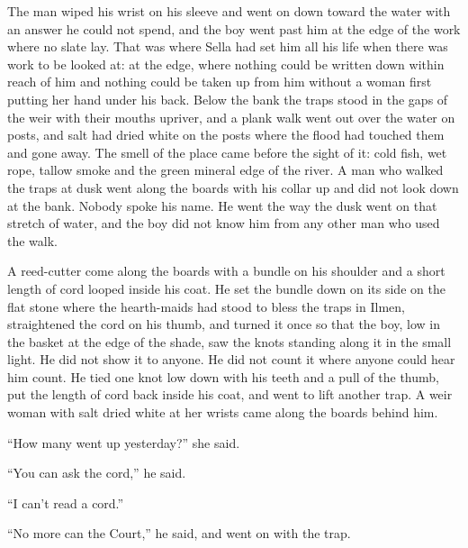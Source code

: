 The man wiped his wrist on his sleeve and went on down toward the water with an answer he could not spend, and the boy went past him at the edge of the work where no slate lay. That was where Sella had set him all his life when there was work to be looked at: at the edge, where nothing could be written down within reach of him and nothing could be taken up from him without a woman first putting her hand under his back. Below the bank the traps stood in the gaps of the weir with their mouths upriver, and a plank walk went out over the water on posts, and salt had dried white on the posts where the flood had touched them and gone away. The smell of the place came before the sight of it: cold fish, wet rope, tallow smoke and the green mineral edge of the river. A man who walked the traps at dusk went along the boards with his collar up and did not look down at the bank. Nobody spoke his name. He went the way the dusk went on that stretch of water, and the boy did not know him from any other man who used the walk.

\scenebreak

A reed-cutter come along the boards with a bundle on his shoulder and a short length of cord looped inside his coat. He set the bundle down on its side on the flat stone where the hearth-maids had stood to bless the traps in Ilmen, straightened the cord on his thumb, and turned it once so that the boy, low in the basket at the edge of the shade, saw the knots standing along it in the small light. He did not show it to anyone. He did not count it where anyone could hear him count. He tied one knot low down with his teeth and a pull of the thumb, put the length of cord back inside his coat, and went to lift another trap. A weir woman with salt dried white at her wrists came along the boards behind him.

“How many went up yesterday?” she said.

“You can ask the cord,” he said.

“I can't read a cord.”

“No more can the Court,” he said, and went on with the trap.

